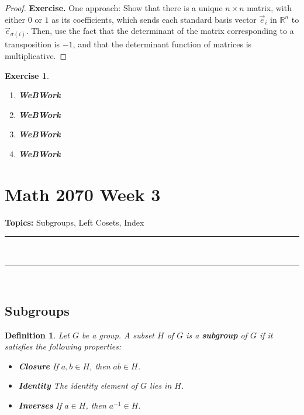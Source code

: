 \documentclass[a4paper,12pt]{report}
\newcounter{statement}
\numberwithin{statement}{chapter}
\newtheorem{defn}[statement]{Definition}
\newtheorem{ex}[statement]{\bf Exercise}
\numberwithin{equation}{chapter}
\numberwithin{section}{chapter}
\numberwithin{subsection}{section}
\begin{document}
\begin{proof}

 {\bf Exercise.} 
One approach: Show that there is a unique $n \times n$ matrix, with either $0$ or $1$ as its coefficients,
which sends each standard basis vector $\vec{e}_i$ in $\mathbb{R}^n$ to $\vec{e}_{\sigma(i)}$.
Then, use the fact that the determinant of the matrix corresponding to a transposition is $-1$,
and that the determinant function of matrices is multiplicative.
\end{proof}

\begin{ex}
\begin{enumerate}
\item  
{\bf WeBWork}

\item  
{\bf WeBWork}

\item  
{\bf WeBWork}

\item  
{\bf WeBWork}
\end{enumerate}\end{ex}\setcounter{chapter}{3}\setcounter{section}{0}
\setcounter{subsection}{0}
\setcounter{statement}{0}

\chapter*{Math 2070 Week 3}
{\bf Topics: }Subgroups, Left Cosets, Index
\hrule





\quad\\\hrule
\quad\\
\section*{Subgroups}

\begin{defn}
Let $G$ be a group.
A subset $H$ of $G$ is a  {\bf subgroup}  of $G$ if it satisfies the following properties:




\begin{itemize}
\item 
 {\bf Closure}  If $a, b \in H$, then $ab \in H$.

\item 
 {\bf Identity}  The identity element of $G$ lies in $H$.

\item 
 {\bf Inverses}  If $a \in H$, then $a^{-1} \in H$.
\end{itemize}

\end{defn}
\end{document}
